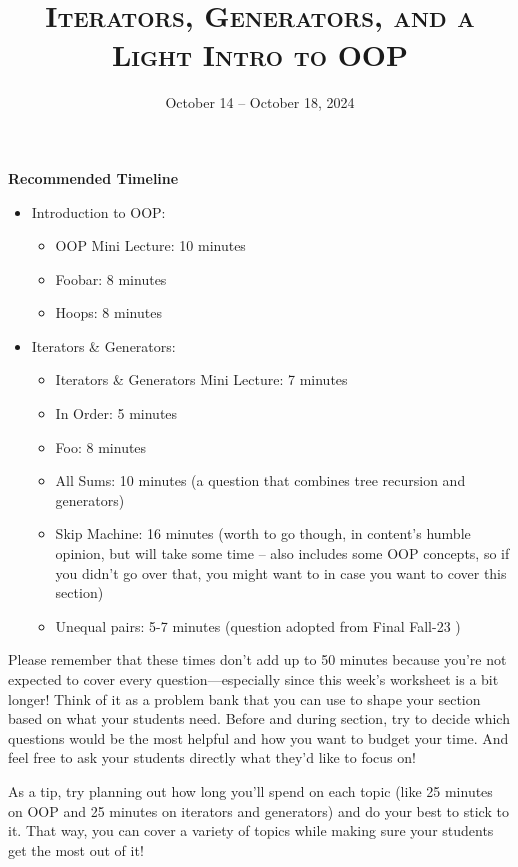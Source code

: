 \documentclass{exam}
\title{\textsc{Iterators, Generators, and a Light Intro to OOP}}
\date{October 14 -- October 18, 2024}
\begin{document}
\maketitle
\begin{guide}
    \textbf{Recommended Timeline}
    \begin{itemize}
        \item Introduction to OOP:
        \begin{itemize}
            \item OOP Mini Lecture: 10 minutes
            \item Foobar: 8 minutes
            \item Hoops: 8 minutes
        \end{itemize}
        \item Iterators \& Generators:
        \begin{itemize}
            \item Iterators \& Generators Mini Lecture: 7 minutes
            \item In Order: 5 minutes
            \item Foo: 8 minutes
            \item All Sums: 10 minutes (a question that combines tree recursion and generators)
            \item Skip Machine: 16 minutes (worth to go though, in content's humble opinion, but will take some time -- also includes some OOP concepts, so if you didn't go over that, you might want to in case you want to cover this section)
           \item Unequal pairs: 5-7 minutes (question adopted from Final Fall-23 )
        \end{itemize}
    \end{itemize}

Please remember that these times don’t add up to 50 minutes because you’re not expected to cover every question—especially since this week’s worksheet is a bit longer! Think of it as a problem bank that you can use to shape your section based on what your students need. Before and during section, try to decide which questions would be the most helpful and how you want to budget your time. And feel free to ask your students directly what they’d like to focus on!

As a tip, try planning out how long you’ll spend on each topic (like 25 minutes on OOP and 25 minutes on iterators and generators) and do your best to stick to it. That way, you can cover a variety of topics while making sure your students get the most out of it!
\end{guide}
\end{document}
